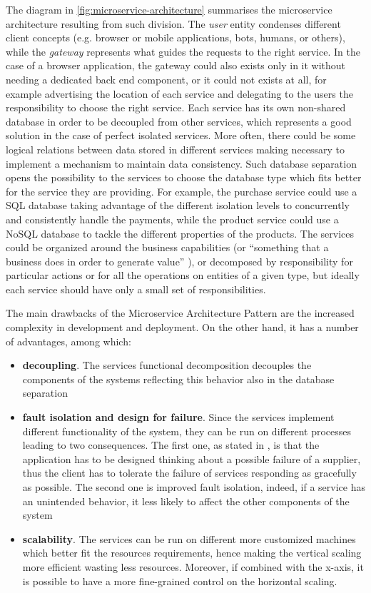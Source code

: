 The diagram in \autoref{fig:microservice-architecture} summarises the
microservice architecture resulting from such division. The \emph{user} entity
condenses different client concepts (e.g. browser or mobile applications, bots,
humans, or others), while the \emph{gateway} represents what guides the requests
to the right service. In the case of a browser application, the gateway could
also exists only in it without needing a dedicated back end component, or it
could not exists at all, for example advertising the location of each service
and delegating to the users the responsibility to choose the right service. Each
service has its own non-shared database in order to be decoupled from other
services, which represents a good solution in the case of perfect isolated
services. More often, there could be some logical relations between data stored
in different services making necessary to implement a mechanism to maintain data
consistency. Such database separation opens the possibility to the services to
choose the database type which fits better for the service they are providing.
For example, the purchase service could use a SQL database taking advantage of
the different isolation levels to concurrently and consistently handle the
payments, while the product service could use a NoSQL database to tackle the
different properties of the products. The services could be organized around the
business capabilities (or ``something that a business does in order to generate
value'' \cite{bib:decompose-business-capability}), or decomposed by
responsibility for particular actions or for all the operations on entities of a
given type, but ideally each service should have only a small set of
responsibilities.

The main drawbacks of the Microservice Architecture Pattern
\cite{bib:microservice-architecture} are the increased complexity in development
and deployment. On the other hand, it has a number of advantages, among which:

\begin{itemize}
	\item \textbf{decoupling}. The services functional decomposition decouples the
	components of the systems reflecting this behavior also in the database
	separation
	\item \textbf{fault isolation and design for failure}. Since the services
	implement different functionality of the system, they can be run on different
	processes leading to two consequences. The first one, as stated in
	\cite{bib:microservices-martin-fowler}, is that the application has to be
	designed thinking about a possible failure of a supplier, thus the client has
	to tolerate the failure of services responding as gracefully as possible. The
	second one is improved fault isolation, indeed, if a service has an unintended
	behavior, it less likely to affect the other components of the system
	\item \textbf{scalability}. The services can be run on different more
	customized machines which better fit the resources requirements, hence making
	the vertical scaling more efficient wasting less resources. Moreover, if
	combined with the x-axis, it is possible to have a more fine-grained control
	on the horizontal scaling.
\end{itemize}

